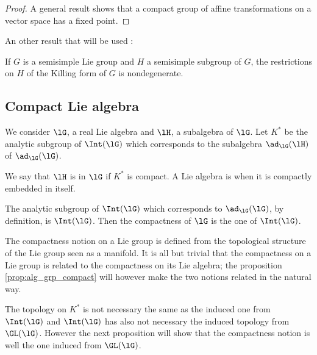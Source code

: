 \begin{proof}
A general result shows that a compact group of affine transformations on a vector space has a fixed point.

\end{proof}

An other result that will be used :
\begin{lemma}		\label{lem:Killing_ss_descent}
If $G$ is a semisimple Lie group and $H$ a semisimple subgroup of $G$, the restrictions on $H$ of the Killing form of $G$ is nondegenerate.
\end{lemma}

\subsection{Compact Lie algebra}\label{pg:compact_Lie}

We consider $\lG$, a real Lie algebra and $\lH$, a subalgebra of $\lG$. Let $K^*$ be the analytic subgroup of $\Int(\lG)$ which corresponds to the subalgebra $\ad_{\lG}(\lH)$ of $\ad_{\lG}(\lG)$. 

\begin{definition}
We say that $\lH$ is  in $\lG$ if $K^*$ is compact. A Lie algebra is  when it is compactly embedded in itself.
\end{definition}

The analytic subgroup of $\Int(\lG)$ which corresponds to $\ad_{\lG}(\lG)$, by definition, is $\Int(\lG)$. Then the compactness of $\lG$ is the one of $\Int(\lG)$.

\begin{remark}
The compactness notion on a Lie group is defined from the topological structure of the Lie group seen as a manifold. It is all but trivial that the compactness on a Lie group is related to the compactness on its Lie algebra; the proposition \ref{prop:alg_grp_compact} will however make the two notions related in the natural way.
\end{remark}

\begin{remark}
The topology on $K^*$ is not necessary the same as the induced one from $\Int(\lG)$ and $\Int(\lG)$ has also not necessary the induced topology from $\GL(\lG)$. However the next proposition will show that the compactness notion is well the one induced from $\GL(\lG)$.
\end{remark}

